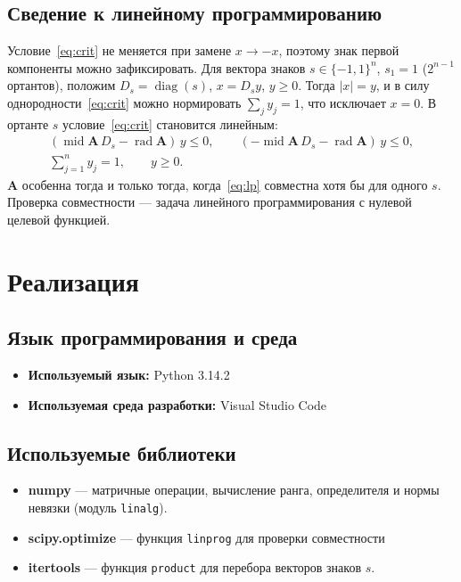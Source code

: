 \documentclass[a4paper, 14pt]{extarticle}
\begin{document}
\subsection{Сведение к линейному программированию}

Условие~\eqref{eq:crit} не меняется при замене $x \to -x$, поэтому знак первой компоненты можно зафиксировать. Для вектора знаков $s \in \{-1, 1\}^n$, $s_1 = 1$ ($2^{n-1}$ ортантов), положим $D_s = \operatorname{diag}(s)$, $x = D_s y$, $y \ge 0$. Тогда $|x| = y$, и в силу однородности~\eqref{eq:crit} можно нормировать $\sum_j y_j = 1$, что исключает $x = 0$. В ортанте $s$ условие~\eqref{eq:crit} становится линейным:
\begin{equation}
    \begin{gathered}
        (\operatorname{mid}\mathbf{A}\,D_s - \operatorname{rad}\mathbf{A})\,y \le 0, \qquad
        (-\operatorname{mid}\mathbf{A}\,D_s - \operatorname{rad}\mathbf{A})\,y \le 0,\\
        \sum_{j=1}^n y_j = 1, \qquad y \ge 0.
    \end{gathered}
    \label{eq:lp}
\end{equation}
$\mathbf{A}$ особенна тогда и только тогда, когда~\eqref{eq:lp} совместна хотя бы для одного $s$. Проверка совместности --- задача линейного программирования с нулевой целевой функцией.

\section{Реализация}

\subsection{Язык программирования и среда}
\begin{itemize}
    \item \textbf{Используемый язык:} Python 3.14.2
    \item \textbf{Используемая среда разработки:} Visual Studio Code
\end{itemize}

\subsection{Используемые библиотеки}
\begin{itemize}
    \item \textbf{numpy} --- матричные операции, вычисление ранга, определителя и нормы невязки (модуль \texttt{linalg}).
    \item \textbf{scipy.optimize} --- функция \texttt{linprog} для проверки совместности
    \item \textbf{itertools} --- функция \texttt{product} для перебора векторов знаков $s$.
\end{itemize}
\end{document}
